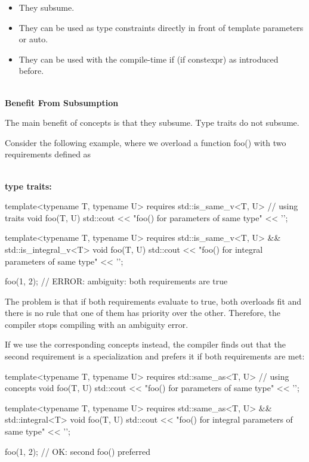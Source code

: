 \begin{itemize}
\item
They subsume.

\item
They can be used as type constraints directly in front of template parameters or auto.

\item
They can be used with the compile-time if (if constexpr) as introduced before.
\end{itemize}

\noindent
\hspace*{\fill} \\ %
\textbf{Benefit From Subsumption}


The main benefit of concepts is that they subsume. Type traits do not subsume.

Consider the following example, where we overload a function foo() with two requirements defined as


\noindent
\hspace*{\fill} \\ %
\textbf{type traits:}

\begin{cpp}
template<typename T, typename U>
requires std::is_same_v<T, U> // using traits
void foo(T, U)
{
	std::cout << "foo() for parameters of same type" << '\n';
}

template<typename T, typename U>
requires std::is_same_v<T, U> && std::is_integral_v<T>
void foo(T, U)
{
	std::cout << "foo() for integral parameters of same type" << '\n';
}

foo(1, 2); // ERROR: ambiguity: both requirements are true
\end{cpp}

The problem is that if both requirements evaluate to true, both overloads fit and there is no rule that one of them has priority over the other. Therefore, the compiler stops compiling with an ambiguity error.

If we use the corresponding concepts instead, the compiler finds out that the second requirement is a specialization and prefers it if both requirements are met:

\begin{cpp}
template<typename T, typename U>
requires std::same_as<T, U> // using concepts
void foo(T, U)
{
	std::cout << "foo() for parameters of same type" << '\n';
}

template<typename T, typename U>
requires std::same_as<T, U> && std::integral<T>
void foo(T, U)
{
	std::cout << "foo() for integral parameters of same type" << '\n';
}

foo(1, 2); // OK: second foo() preferred
\end{cpp}

